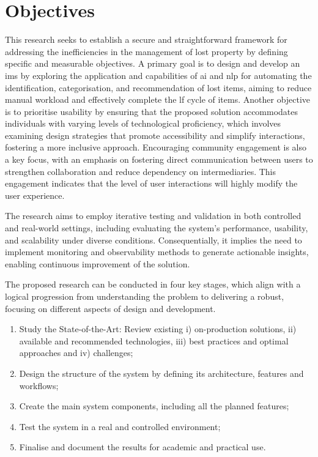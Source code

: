 \section{Objectives} \label{section:objectives}


This research seeks to establish a secure and straightforward framework for addressing the inefficiencies in the management of lost property by defining specific and measurable objectives. A primary goal is to design and develop an \ac{ims} by exploring the application and capabilities of \ac{ai} and \ac{nlp} for automating the identification, categorisation, and recommendation of lost items, aiming to reduce manual workload and effectively complete the \ac{lf} cycle of items. Another objective is to prioritise usability by ensuring that the proposed solution accommodates individuals with varying levels of technological proficiency, which involves examining design strategies that promote accessibility and simplify interactions, fostering a more inclusive approach. Encouraging community engagement is also a key focus, with an emphasis on fostering direct communication between users to strengthen collaboration and reduce dependency on intermediaries. This engagement indicates that the level of user interactions will highly modify the user experience.

The research aims to employ iterative testing and validation in both controlled and real-world settings, including evaluating the system's performance, usability, and scalability under diverse conditions. Consequentially, it implies the need to implement monitoring and observability methods to generate actionable insights, enabling continuous improvement of the solution.

The proposed research can be conducted in four key stages, which align with a logical progression from understanding the problem to delivering a robust, focusing on different aspects of design and development.

\begin{enumerate}
    \item Study the State-of-the-Art: Review existing i) on-production solutions, ii) available and recommended technologies, iii) best practices and optimal approaches and iv) challenges;
    \item Design the structure of the system by defining its architecture, features and workflows;
    \item Create the main system components, including all the planned features;
    \item Test the system in a real and controlled environment;
    \item Finalise and document the results for academic and practical use.
\end{enumerate}

